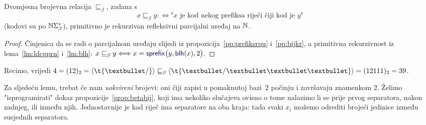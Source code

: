 \begin{korolar}[{name=[primitivna rekurzivnost relacije "biti prefiks"]}]\label{kor:preceqprnrpu}
Dvomjesna brojevna relacija $\sqsubseteq_\beta$, zadana s
\begin{equation}
    x\sqsubseteq_\beta y:\Longleftrightarrow\text{"$x$ je kod nekog prefiksa riječi čiji kod je $y$"}
\end{equation}
(kodovi su po ${\mathbb N}\Sigma_\beta^*$), primitivno je rekurzivan refleksivni parcijalni uređaj na ${\mathbb N}$.
\end{korolar}
\begin{proof}
    Činjenica da se radi o parcijalnom uređaju slijedi iz propozicija~\ref{pp:prefiksrpu} i~\ref{pp:bijkr}, a primitivna rekurzivnost iz lema~\ref{lm:ldcpprn} i~\ref{lm:blh}: $x\sqsubseteq_\beta y\Longleftrightarrow x=\f{sprefix}\bigl(y,\f{blh}(x),2\bigr)$.
\end{proof}

\begin{primjer}[{name=[prateća relacija "prefiks"]}]
Recimo, vrijedi $4=(12)_2=\kr{\t{\textbullet/}}\sqsubseteq_\beta\kr{\t{\textbullet/\textbullet\textbullet\textbullet}}=(12111)_2=39$.
\end{primjer}

Za sljedeću lemu, trebat će nam \emph{uokvireni} brojevi: oni čiji zapisi u pomaknutoj bazi~$2$ počinju i završavaju znamenkom $2$. Želimo "isprogramirati" dokaz propozicije~\ref{prop:betabij}, koji ima nekoliko slučajeva ovisno o tome nalazimo li se prije prvog separatora, nakon zadnjeg, ili između njih. Jednostavnije je kad riječ ima separatore na oba kraja: tada svaki $x_i$ možemo odrediti brojeći jedinice između susjednih separatora.

